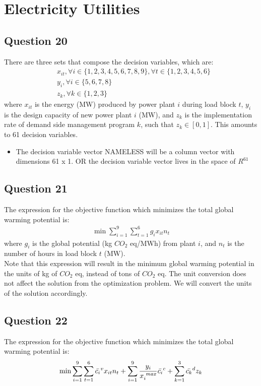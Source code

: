 \documentclass[11pt,a4paper]{article}
\begin{document}
\section*{Electricity Utilities}
\subsection*{Question 20}
There are three sets that compose the decision variables, which are:
\begin{align*}
	& x_{it},  \forall  i \in \{1,2,3,4,5,6,7,8,9\}, \forall  t \in \{1,2,3,4,5,6\}\\
	& y_i,  \forall  i \in \{5,6,7,8\}\\
	& z_k,  \forall  k \in \{1,2,3\}
\end{align*}
where $x_{it}$ is the energy (MW) produced by power plant $i$ during load block $t$,
$y_i$ is the design capacity of new power plant $i$ (MW), and $z_k$ is the implementation rate of demand side management program $k$, such that $z_k \in  [0,1]$. This amounts to 61 decision variables. 
\begin{itemize}
	\item The decision variable vector NAMELESS will be a column vector with dimensions 61 x 1. OR the decision variable vector lives in the space of $R^{61}$
\end{itemize}

\subsection*{Question 21}
The expression for the objective function which minimizes the total global warming potential is:
\begin{align*}
	\min \sum_{i=1}^{9}\sum_{t=1}^{6} g_{i}x_{it}n_{t}
\end{align*}
where $g_{i}$ is the global potential (kg $CO_2$ eq/MWh) from plant $i$, and $n_{t}$ is the number of hours in load block $t$ (MW).\\
Note that this expression will result in the minimum global warming potential in the units of kg of $CO_2$ eq, instead of tons of $CO_2$ eq. The unit conversion does not affect the solution from the optimization problem. We will convert the units of the solution accordingly.

\subsection*{Question 22}
The expression for the objective function which minimizes the total global warming potential is:
\begin{align*}
	\min \sum_{i=1}^{9}\sum_{t=1}^{6} \bar{c_{i}}^{v}x_{it}n_{t} + \sum_{i=1}^{9} \frac{y_{i}}{x_{i}^{\text{ \textit{max}}}}\bar{c_{i}}^{c} + \sum_{k=1}^{3}\bar{c_{k}}^{d}z_{k}
\end{align*}
\end{document}
